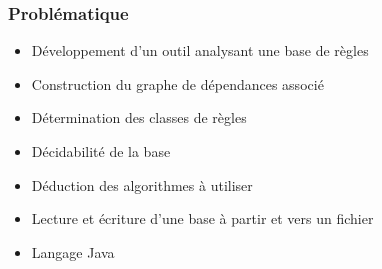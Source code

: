 
\begin{frame}
	\frametitle{Problématique}
	\begin{itemize}
		\item Développement d'un outil analysant une base de règles
		\item Construction du graphe de dépendances associé
		\item Détermination des classes de règles 
		\item Décidabilité de la base
		\item Déduction des algorithmes à utiliser
		\item Lecture et écriture d'une base à partir et vers un fichier
		\item Langage Java
	\end{itemize}
\end{frame}

